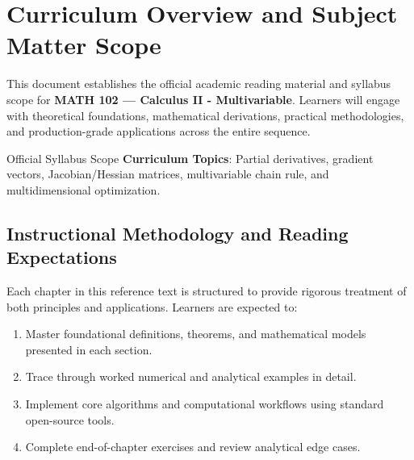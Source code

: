 \section{Curriculum Overview and Subject Matter Scope}

This document establishes the official academic reading material and syllabus scope for \textbf{MATH 102 --- Calculus II - Multivariable}. Learners will engage with theoretical foundations, mathematical derivations, practical methodologies, and production-grade applications across the entire sequence.

\begin{InsightBox}{Official Syllabus Scope}
  \textbf{Curriculum Topics}: Partial derivatives, gradient vectors, Jacobian/Hessian matrices, multivariable chain rule, and multidimensional optimization.
\end{InsightBox}

\subsection{Instructional Methodology and Reading Expectations}

Each chapter in this reference text is structured to provide rigorous treatment of both principles and applications. Learners are expected to:
\begin{enumerate}
  \item Master foundational definitions, theorems, and mathematical models presented in each section.
  \item Trace through worked numerical and analytical examples in detail.
  \item Implement core algorithms and computational workflows using standard open-source tools.
  \item Complete end-of-chapter exercises and review analytical edge cases.
\end{enumerate}

